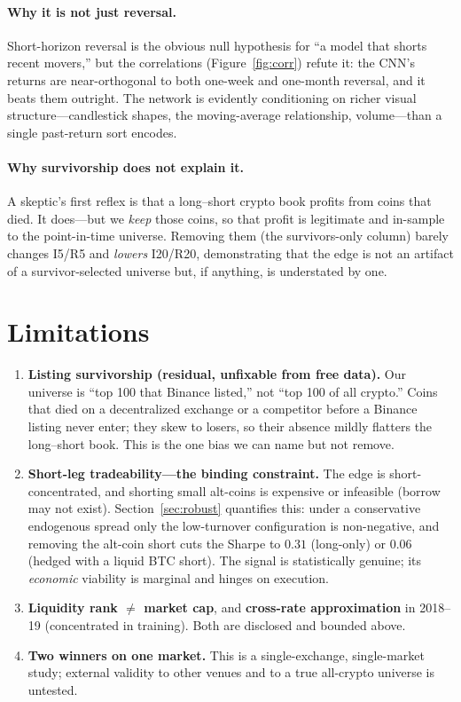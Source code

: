 \documentclass[11pt]{article}
\begin{document}
\paragraph{Why it is not just reversal.} Short-horizon reversal is the obvious null hypothesis for
``a model that shorts recent movers,'' but the correlations (Figure~\ref{fig:corr}) refute it: the
CNN's returns are near-orthogonal to both one-week and one-month reversal, and it beats them
outright. The network is evidently conditioning on richer visual structure---candlestick shapes,
the moving-average relationship, volume---than a single past-return sort encodes.

\paragraph{Why survivorship does not explain it.} A skeptic's first reflex is that a long--short
crypto book profits from coins that died. It does---but we \emph{keep} those coins, so that profit is
legitimate and in-sample to the point-in-time universe. Removing them (the survivors-only column)
barely changes I5/R5 and \emph{lowers} I20/R20, demonstrating that the edge is not an artifact of a
survivor-selected universe but, if anything, is understated by one.

\section{Limitations}

\begin{enumerate}[leftmargin=1.4em,itemsep=2pt]
\item \textbf{Listing survivorship (residual, unfixable from free data).} Our universe is ``top 100
that Binance listed,'' not ``top 100 of all crypto.'' Coins that died on a decentralized exchange or
a competitor before a Binance listing never enter; they skew to losers, so their absence mildly
flatters the long--short book. This is the one bias we can name but not remove.
\item \textbf{Short-leg tradeability---the binding constraint.} The edge is short-concentrated, and
shorting small alt-coins is expensive or infeasible (borrow may not exist). Section~\ref{sec:robust}
quantifies this: under a conservative endogenous spread only the low-turnover configuration is
non-negative, and removing the alt-coin short cuts the Sharpe to $0.31$ (long-only) or $0.06$ (hedged
with a liquid BTC short). The signal is statistically genuine; its \emph{economic} viability is
marginal and hinges on execution.
\item \textbf{Liquidity rank $\ne$ market cap}, and \textbf{cross-rate approximation} in 2018--19
(concentrated in training). Both are disclosed and bounded above.
\item \textbf{Two winners on one market.} This is a single-exchange, single-market study; external
validity to other venues and to a true all-crypto universe is untested.
\end{enumerate}
\end{document}
